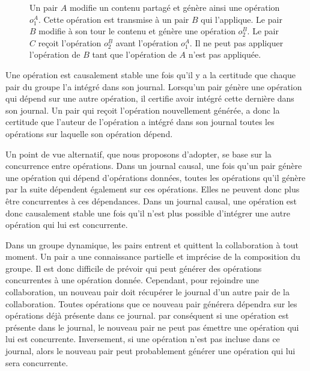 \begin{figure}[ht]
\centering
\begin{utikzcomgraph}{12}{-1.5}
\end{utikzcomgraph}
\caption{Un pair $A$ modifie un contenu partagé et génère ainsi une opération $o_1^A$.
Cette opération est transmise à un pair $B$ qui l'applique.
Le pair $B$ modifie à son tour le contenu et génère une opération $o_2^B$.
Le pair $C$ reçoit l'opération $o_2^B$ avant l'opération $o_1^A$.
Il ne peut pas appliquer l'opération de $B$ tant que l'opération de $A$ n'est pas appliquée.}
\label{fig:causal-delivery}
\end{figure}

Une opération est causalement stable une fois qu'il y a la certitude que chaque  pair du groupe l'a intégré dans son journal.
Lorsqu'un pair génère une opération qui dépend sur une autre opération, il certifie avoir intégré cette dernière dans son journal.
Un pair qui reçoit l'opération nouvellement générée, a donc la certitude que l'auteur de l'opération a intégré dans son journal toutes les opérations sur laquelle son opération dépend.

Un point de vue alternatif, que nous proposons d'adopter, se base sur la concurrence entre opérations.
Dans un journal causal, une fois qu'un pair génère une opération qui dépend d'opérations données, toutes les opérations qu'il génère par la suite dépendent également sur ces opérations.
Elles ne peuvent donc plus être concurrentes à ces dépendances.
Dans un journal causal, une opération est donc causalement stable une fois qu'il n'est plus possible d'intégrer une autre opération qui lui est concurrente.

Dans un groupe dynamique, les pairs entrent et quittent la collaboration à tout moment.
Un pair a une connaissance partielle et imprécise de la composition du groupe. 
Il est donc difficile de prévoir qui peut générer des opérations concurrentes à une opération donnée.
Cependant, pour rejoindre une collaboration, un nouveau pair doit récupérer le journal d'un autre pair de la collaboration.
Toutes opérations que ce nouveau pair générera dépendra sur les opérations déjà présente dans ce journal.
par conséquent si une opération est présente dans le journal, le nouveau pair ne peut pas émettre une opération qui lui est concurrente.
Inversement, si une opération n'est pas incluse dans ce journal, alors le nouveau pair peut probablement générer une opération qui lui sera concurrente.

